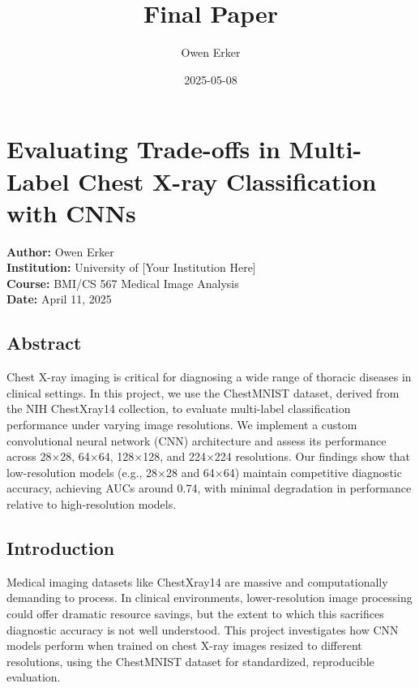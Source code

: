\documentclass[
]{article}
\title{Final Paper}
\author{Owen Erker}
\date{2025-05-08}
\begin{document}
\maketitle

\section{Evaluating Trade-offs in Multi-Label Chest X-ray Classification
with
CNNs}\label{evaluating-trade-offs-in-multi-label-chest-x-ray-classification-with-cnns}

\textbf{Author:} Owen Erker\\
\textbf{Institution:} University of {[}Your Institution Here{]}\\
\textbf{Course:} BMI/CS 567 Medical Image Analysis\\
\textbf{Date:} April 11, 2025

\subsection{Abstract}\label{abstract}

Chest X-ray imaging is critical for diagnosing a wide range of thoracic
diseases in clinical settings. In this project, we use the ChestMNIST
dataset, derived from the NIH ChestXray14 collection, to evaluate
multi-label classification performance under varying image resolutions.
We implement a custom convolutional neural network (CNN) architecture
and assess its performance across 28×28, 64×64, 128×128, and 224×224
resolutions. Our findings show that low-resolution models (e.g., 28×28
and 64×64) maintain competitive diagnostic accuracy, achieving AUCs
around 0.74, with minimal degradation in performance relative to
high-resolution models.

\subsection{Introduction}\label{introduction}

Medical imaging datasets like ChestXray14 are massive and
computationally demanding to process. In clinical environments,
lower-resolution image processing could offer dramatic resource savings,
but the extent to which this sacrifices diagnostic accuracy is not well
understood. This project investigates how CNN models perform when
trained on chest X-ray images resized to different resolutions, using
the ChestMNIST dataset for standardized, reproducible evaluation.
\end{document}
